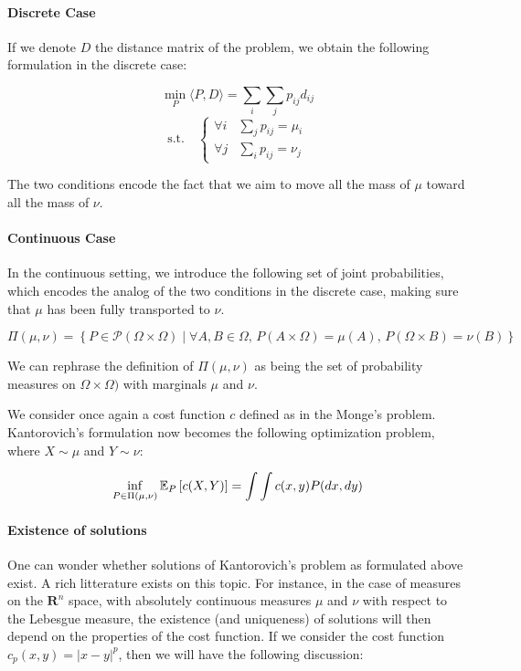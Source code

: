 \paragraph{Discrete Case}

If we denote $D$ the distance matrix of the problem, we obtain the following
formulation in the discrete case:

$$ \min_P \langle P, D \rangle = \sum_i \sum_j p_{ij} d_{ij} $$
\vspace{-4mm}
$$ \text{s.t.} \quad \left\{ \begin{array}{ll}
\forall i & \sum_j p_{ij} = \mu_i \\
\forall j & \sum_i p_{ij} = \nu_j
\end{array} \right. $$

The two conditions encode the fact that we aim to move all the mass of $\mu$
toward all the mass of $\nu$.

\paragraph{Continuous Case}

In the continuous setting, we introduce the following set of joint
probabilities, which encodes the analog of the two conditions in the discrete
case, making sure that $\mu$ has been fully transported to $\nu$.

$$ \Pi(\mu, \nu) = \left\{ P \in \mathcal{P}(\Omega \times \Omega) \mid \forall A, B \in \Omega, \, P(A \times \Omega) = \mu(A), \, P(\Omega \times B) = \nu(B) \right\} $$

We can rephrase the definition of $\Pi(\mu, \nu)$ as being the set of
probability measures on $\Omega \times \Omega)$ with marginals $\mu$ and $\nu$.

We consider once again a cost function $c$ defined as in the Monge's
problem. Kantorovich's formulation now becomes the following optimization
problem, where $X \sim \mu$ and $Y \sim \nu$:

$$ \inf_{P \in \Pi(\mu, \nu)} \mathbb{E}_P \left[ c(X, Y) \right] = \int \int c(x, y) P(dx, dy) $$

\paragraph{Existence of solutions} One can wonder whether solutions of
Kantorovich's problem as formulated above exist. A rich litterature exists
on this topic. For instance, in the case of measures on the $\mathbf{R}^n$
space, with absolutely continuous measures $\mu$ and $\nu$ with respect to
the Lebesgue measure, the existence (and uniqueness) of solutions will then
depend on the properties of the cost function. If we consider the cost
function $c_p(x,y) = | x - y |^p$, then we will have the following discussion:

